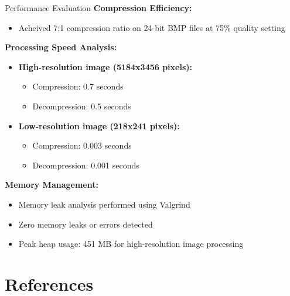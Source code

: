 \documentclass[10pt]{beamer}
\begin{document}
\begin{frame}{Performance Evaluation}
    \textbf{Compression Efficiency:}
    \begin{itemize}
     \item Acheived 7:1 compression ratio on 24-bit BMP files at 75\% quality setting
    \end{itemize}

    \vspace{0.3cm}

    \textbf{Processing Speed Analysis:}
    \begin{itemize}
     \item \textbf{High-resolution image (5184x3456 pixels):}
     \begin{itemize}
      \item Compression: 0.7 seconds
      \item Decompression: 0.5 seconds
     \end{itemize}

     \item \textbf{Low-resolution image (218x241 pixels):}
     \begin{itemize}
      \item Compression: 0.003 seconds
      \item Decompression: 0.001 seconds
     \end{itemize}
    \end{itemize}

    \vspace{0.3cm}

    \textbf{Memory Management:}
    \begin{itemize}
     \item Memory leak analysis performed using Valgrind
     \item Zero memory leaks or errors detected
     \item Peak heap usage: 451 MB for high-resolution image processing
    \end{itemize}
\end{frame}

\section{References}
\end{document}
